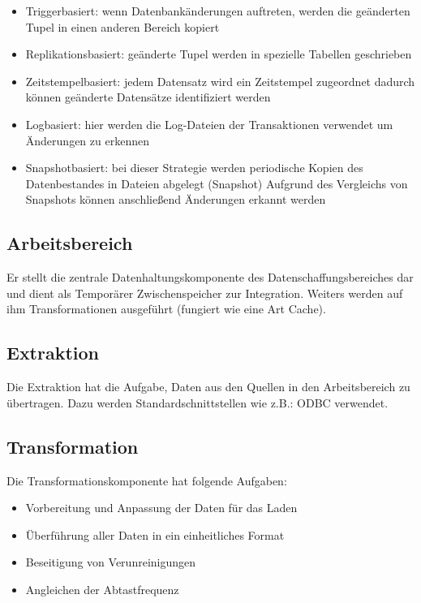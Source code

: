 \begin{itemize}
    \item Triggerbasiert: wenn Datenbankänderungen auftreten, werden die geänderten Tupel in einen anderen Bereich kopiert
    \item Replikationsbasiert: geänderte Tupel werden in spezielle Tabellen geschrieben
    \item Zeitstempelbasiert: jedem Datensatz wird ein Zeitstempel zugeordnet dadurch können geänderte Datensätze identifiziert werden
    \item Logbasiert: hier werden die Log-Dateien der Transaktionen verwendet um Änderungen zu erkennen
    \item Snapshotbasiert: bei dieser Strategie werden periodische Kopien des Datenbestandes in Dateien abgelegt (Snapshot) Aufgrund des Vergleichs von Snapshots können anschließend Änderungen erkannt werden
\end{itemize}

\subsection{Arbeitsbereich}

Er stellt die zentrale Datenhaltungskomponente des Datenschaffungsbereiches dar und dient als Temporärer Zwischenspeicher zur Integration. Weiters werden auf ihm Transformationen ausgeführt (fungiert wie eine Art Cache).

\subsection{Extraktion}

Die Extraktion hat die Aufgabe, Daten aus den Quellen in den Arbeitsbereich zu übertragen. Dazu werden Standardschnittstellen wie z.B.: ODBC verwendet.

\subsection{Transformation}

Die Transformationskomponente hat folgende Aufgaben:
\begin{itemize}
    \item Vorbereitung und Anpassung der Daten für das Laden
    \item Überführung aller Daten in ein einheitliches Format
    \item Beseitigung von Verunreinigungen
    \item Angleichen der Abtastfrequenz
\end{itemize}

